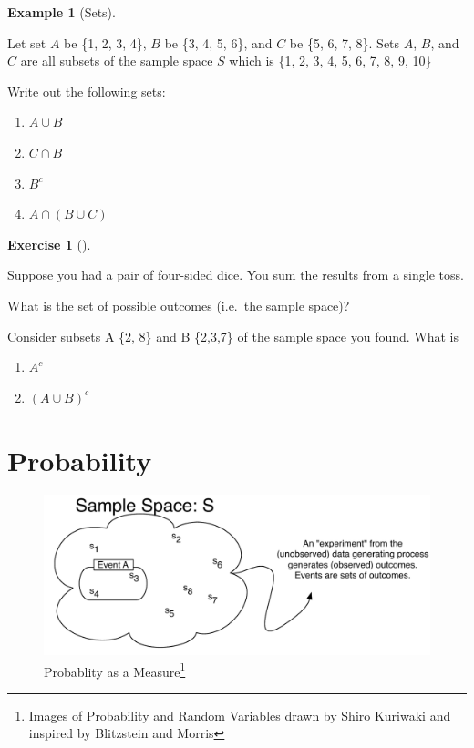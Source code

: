 \documentclass[
  letterpaper,
]{book}
\providecommand{\tightlist}{%
  \setlength{\itemsep}{0pt}\setlength{\parskip}{0pt}}\usepackage{longtable,booktabs,array}
\theoremstyle{definition}
\theoremstyle{definition}
\newtheorem{example}{Example}[chapter]
\theoremstyle{plain}
\theoremstyle{definition}
\newtheorem{exercise}{Exercise}[chapter]
\theoremstyle{plain}
\theoremstyle{plain}
\theoremstyle{remark}
\begin{document}
\leavevmode{}%
\begin{example}[Sets]\label{exm-sets}

Let set \(A\) be \{1, 2, 3, 4\}, \(B\) be \{3, 4, 5, 6\}, and \(C\) be
\{5, 6, 7, 8\}. Sets \(A\), \(B\), and \(C\) are all subsets of the
sample space \(S\) which is \{1, 2, 3, 4, 5, 6, 7, 8, 9, 10\}

Write out the following sets:

\begin{enumerate}
\def\labelenumi{\arabic{enumi}.}
\tightlist
\item
  \(A \cup B\)
\item
  \(C \cap B\)
\item
  \(B^c\)
\item
  \(A \cap (B \cup C)\)
\end{enumerate}

\end{example}

\leavevmode{}%
\begin{exercise}[]\label{exr-sets1}

Suppose you had a pair of four-sided dice. You sum the results from a
single toss.

What is the set of possible outcomes (i.e.~the sample space)?

Consider subsets A \{2, 8\} and B \{2,3,7\} of the sample space you
found. What is

\begin{enumerate}
\def\labelenumi{\arabic{enumi}.}
\tightlist
\item
  \(A^c\)
\item
  \((A \cup B)^c\)
\end{enumerate}

\end{exercise}

\hypertarget{probdef}{%
\section{Probability}\label{probdef}}

\begin{figure}

{\centering \includegraphics{./images/probability.pdf}

}

\caption{\label{fig-prob-image}Probablity as a Measure\footnote{Images
  of Probability and Random Variables drawn by Shiro Kuriwaki and
  inspired by Blitzstein and Morris}}

\end{figure}
\end{document}
